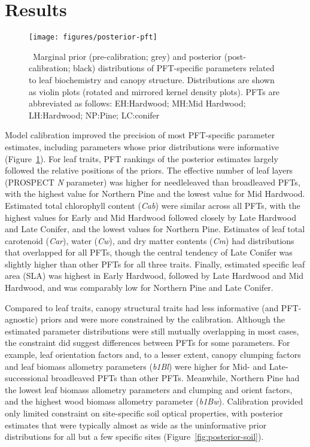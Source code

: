 \section{Results}

\begin{figure}
  \centering
  \texttt{[image: figures/posterior-pft]}
  \caption{\label{fig:posterior-pft}\
    Marginal prior (pre-calibration; grey) and posterior (post-calibration; black) distributions of PFT-specific parameters
    related to leaf biochemistry and canopy structure.
    Distributions are shown as violin plots (rotated and mirrored kernel density plots).
    PFTs are abbreviated as follows:
    EH:\@Early Hardwood;
    MH:\@North Mid Hardwood;
    LH:\@Late Hardwood;
    NP:\@Northern Pine;
    LC:\@Late conifer
  }
\end{figure}

Model calibration improved the precision of most PFT-specific parameter estimates, including parameters whose prior distributions were informative (Figure~\ref{fig:posterior-pft}).
For leaf traits, PFT rankings of the posterior estimates largely followed the relative positions of the priors.
The effective number of leaf layers (PROSPECT \emph{N} parameter) was higher for needleleaved than broadleaved PFTs, with the highest value for Northern Pine and the lowest value for Mid Hardwood.
Estimated total chlorophyll content (\emph{Cab}) were similar across all PFTs, with the highest values for Early and Mid Hardwood followed closely by Late Hardwood and Late Conifer, and the lowest values for Northern Pine.
Estimates of leaf total carotenoid (\emph{Car}), water (\emph{Cw}), and dry matter contents (\emph{Cm}) had distributions that overlapped for all PFTs, though the central tendency of Late Conifer was slightly higher than other PFTs for all three traits.
Finally, estimated specific leaf area (SLA) was highest in Early Hardwood, followed by Late Hardwood and Mid Hardwood, and was comparably low for Northern Pine and Late Conifer.

Compared to leaf traits, canopy structural traits had less informative (and PFT-agnostic) priors and were more constrained by the calibration.
Although the estimated parameter distributions were still mutually overlapping in most cases, the constraint did suggest differences between PFTs for some parameters.
For example, leaf orientation factors and, to a lesser extent, canopy clumping factors and leaf biomass allometry parameters (\emph{b1Bl}) were higher for Mid- and Late-successional broadleaved PFTs than other PFTs.
Meanwhile, Northern Pine had the lowest leaf biomass allometry parameters and clumping and orient factors, and the highest wood biomass allometry parameter (\emph{b1Bw}).
Calibration provided only limited constraint on site-specific soil optical properties, with posterior estimates that were typically almost as wide as the uninformative prior distributions for all but a few specific sites (Figure~\ref{fig:posterior-soil}).

